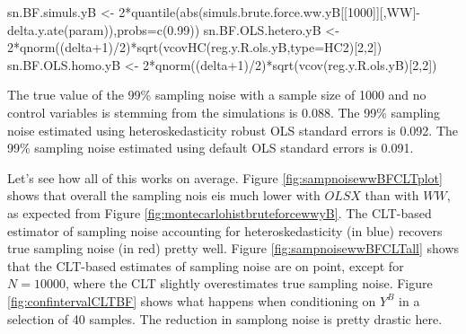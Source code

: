 \documentclass[
]{book}
\newenvironment{Shaded}{\begin{snugshade}}{\end{snugshade}}
\newcommand{\AttributeTok}[1]{\textcolor[rgb]{0.77,0.63,0.00}{#1}}
\newcommand{\DecValTok}[1]{\textcolor[rgb]{0.00,0.00,0.81}{#1}}
\newcommand{\FloatTok}[1]{\textcolor[rgb]{0.00,0.00,0.81}{#1}}
\newcommand{\FunctionTok}[1]{\textcolor[rgb]{0.00,0.00,0.00}{#1}}
\newcommand{\NormalTok}[1]{#1}
\newcommand{\OtherTok}[1]{\textcolor[rgb]{0.56,0.35,0.01}{#1}}
\newcommand{\SpecialCharTok}[1]{\textcolor[rgb]{0.00,0.00,0.00}{#1}}
\newcommand{\StringTok}[1]{\textcolor[rgb]{0.31,0.60,0.02}{#1}}
\theoremstyle{definition}
\theoremstyle{definition}
\theoremstyle{definition}
\theoremstyle{definition}
\theoremstyle{remark}
\begin{document}
\begin{Shaded}
\begin{Highlighting}[]
\NormalTok{sn.BF.simuls.yB }\OtherTok{\textless{}{-}} \DecValTok{2}\SpecialCharTok{*}\FunctionTok{quantile}\NormalTok{(}\FunctionTok{abs}\NormalTok{(simuls.brute.force.ww.yB[[}\StringTok{\textquotesingle{}1000\textquotesingle{}}\NormalTok{]][,}\StringTok{\textquotesingle{}WW\textquotesingle{}}\NormalTok{]}\SpecialCharTok{{-}}\FunctionTok{delta.y.ate}\NormalTok{(param)),}\AttributeTok{probs=}\FunctionTok{c}\NormalTok{(}\FloatTok{0.99}\NormalTok{))}
\NormalTok{sn.BF.OLS.hetero.yB }\OtherTok{\textless{}{-}} \DecValTok{2}\SpecialCharTok{*}\FunctionTok{qnorm}\NormalTok{((delta}\SpecialCharTok{+}\DecValTok{1}\NormalTok{)}\SpecialCharTok{/}\DecValTok{2}\NormalTok{)}\SpecialCharTok{*}\FunctionTok{sqrt}\NormalTok{(}\FunctionTok{vcovHC}\NormalTok{(reg.y.R.ols.yB,}\AttributeTok{type=}\StringTok{\textquotesingle{}HC2\textquotesingle{}}\NormalTok{)[}\DecValTok{2}\NormalTok{,}\DecValTok{2}\NormalTok{])}
\NormalTok{sn.BF.OLS.homo.yB }\OtherTok{\textless{}{-}} \DecValTok{2}\SpecialCharTok{*}\FunctionTok{qnorm}\NormalTok{((delta}\SpecialCharTok{+}\DecValTok{1}\NormalTok{)}\SpecialCharTok{/}\DecValTok{2}\NormalTok{)}\SpecialCharTok{*}\FunctionTok{sqrt}\NormalTok{(}\FunctionTok{vcov}\NormalTok{(reg.y.R.ols.yB)[}\DecValTok{2}\NormalTok{,}\DecValTok{2}\NormalTok{])}
\end{Highlighting}
\end{Shaded}

The true value of the 99\% sampling noise with a sample size of 1000 and no control variables is stemming from the simulations is 0.088.
The 99\% sampling noise estimated using heteroskedasticity robust OLS standard errors is 0.092.
The 99\% sampling noise estimated using default OLS standard errors is 0.091.

Let's see how all of this works on average.
Figure \ref{fig:sampnoisewwBFCLTplot} shows that overall the sampling nois eis much lower with \(OLSX\) than with \(WW\), as expected from Figure \ref{fig:montecarlohistbruteforcewwyB}.
The CLT-based estimator of sampling noise accounting for heteroskedasticity (in blue) recovers true sampling noise (in red) pretty well.
Figure \ref{fig:sampnoisewwBFCLTall} shows that the CLT-based estimates of sampling noise are on point, except for \(N=10000\), where the CLT slightly overestimates true sampling noise.
Figure \ref{fig:confintervalCLTBF} shows what happens when conditioning on \(Y^B\) in a selection of 40 samples.
The reduction in samplong noise is pretty drastic here.
\end{document}
